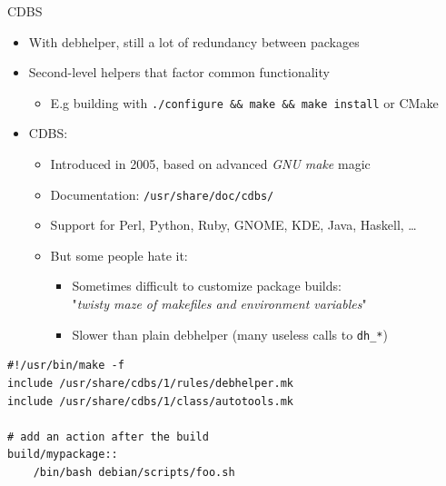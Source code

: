 \documentclass[10pt,final]{beamer}
\begin{document}
\begin{frame}[fragile]{CDBS}
  \hbr
  \begin{itemize}
  \item With debhelper, still a lot of redundancy between packages
    \hbr
  \item Second-level helpers that factor common functionality
    \begin{itemize}
    \item E.g building with \texttt{./configure \&\& make \&\& make install} or CMake
    \end{itemize}
    \hbr
  \item CDBS:
    \begin{itemize}
    \item Introduced in 2005, based on advanced \textsl{GNU make} magic
    \item Documentation: \texttt{/usr/share/doc/cdbs/}
    \item Support for Perl, Python, Ruby, GNOME, KDE, Java, Haskell, \ldots
    \item But some people hate it:
      \begin{itemize}
      \item Sometimes difficult to customize package builds:\\
        "\textsl{twisty maze of makefiles and environment variables}"
      \item Slower than plain debhelper (many useless calls to \texttt{dh\_*})
      \end{itemize}
    \end{itemize}
  \end{itemize}
  \seprule
      \begin{lstlisting}[basicstyle=\ttfamily\footnotesize,escapeinside=\{\}]
#!/usr/bin/make -f
include /usr/share/cdbs/1/rules/debhelper.mk
include /usr/share/cdbs/1/class/autotools.mk

# add an action after the build
build/mypackage::
    /bin/bash debian/scripts/foo.sh
      \end{lstlisting}
\end{frame}
\end{document}
